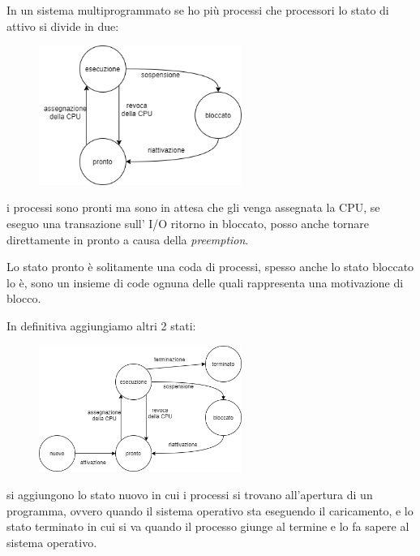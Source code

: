 In un sistema multiprogrammato se ho più processi che processori lo stato di attivo si divide in due:
\begin{figure}[H]
    \centering
    \includegraphics[width=250px]{images/3_Gestione_dei_processi/stati_processo_multiprogrammato.png}
\end{figure}
i processi sono pronti ma sono in attesa che gli venga assegnata la CPU, se eseguo una transazione sull' I/O ritorno in bloccato, posso anche tornare direttamente in pronto a causa della \emph{preemption}.

Lo stato pronto è solitamente una coda di processi, spesso anche lo stato bloccato lo è, sono un insieme di code ognuna delle quali rappresenta una motivazione di blocco.

In definitiva aggiungiamo altri 2 stati:
\begin{figure}[H]
    \centering
    \includegraphics[width=250px]{images/3_Gestione_dei_processi/stati_processo_completo.png}
\end{figure}
si aggiungono lo stato nuovo in cui i processi si trovano all'apertura di un programma, ovvero quando il sistema operativo sta eseguendo il caricamento, e lo stato terminato in cui si va quando il processo giunge al termine e lo fa sapere al sistema operativo.

